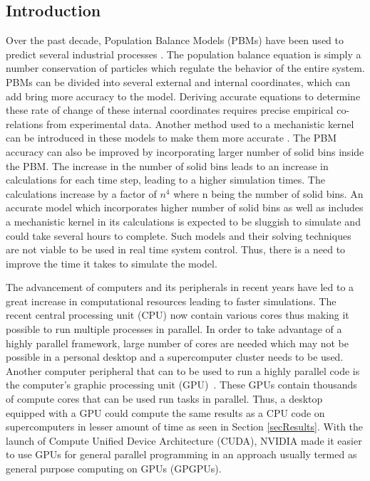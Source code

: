 \documentclass[preprint,10pt,authoryear,review]{elsarticle}
\begin{document}
\begin{linenumbers}
\section{Introduction}
\label{secIntro}
Over the past decade, Population Balance Models (PBMs) have been used to predict 
several industrial processes \citep{ramkrishna2014}. The population balance equation is 
simply a number conservation of particles which regulate the behavior of the entire system.
PBMs can be divided into several external and internal coordinates, which can add 
bring more accuracy to the model. Deriving accurate equations to determine these rate of change 
of these  internal coordinates requires precise empirical co-relations from 
experimental data. Another method used to a mechanistic kernel can be introduced in these 
models to make them more accurate \citep{Barrasso2015cerd}. 
The PBM accuracy can also be improved by incorporating larger number of solid bins 
inside the PBM. The increase in the number of solid bins leads to an increase in 
calculations for each time step, leading to a higher simulation times. The calculations 
increase by a factor of $n^4$ where n being the number of solid bins. An accurate model 
which incorporates higher number of solid bins as well as includes a mechanistic kernel 
in its calculations is expected to be sluggish to simulate and could take several hours 
to complete. Such models and their solving techniques are not viable to be used in real 
time system control. Thus, there is a need to improve the time it takes to simulate the 
model.

The advancement of computers and its peripherals in recent years have led to a great increase in 
computational resources leading to faster simulations. The recent central processing unit (CPU) 
now contain various cores thus making it possible to run multiple processes in parallel. 
In order to take advantage of a highly parallel framework, large number of cores are needed 
which may not be possible in a personal desktop and a supercomputer cluster needs to be used.
Another computer peripheral that can to be used to run a highly parallel code is the computer's 
graphic processing unit (GPU)~\citep{Prakash2013b}. These GPUs contain thousands of compute 
cores that can be used run tasks in parallel. Thus, a desktop equipped with a GPU could 
compute the same results as a CPU code on supercomputers in lesser amount of time as seen 
in Section \ref{secResults}. With the launch of Compute Unified Device Architecture (CUDA), 
NVIDIA made it easier to use GPUs for general parallel programming in an approach usually 
termed as general purpose computing on GPUs (GPGPUs).


\end{linenumbers}
\end{document}
